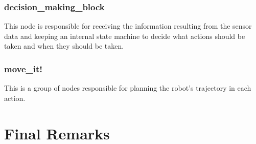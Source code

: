 \subsubsection{decision\_making\_block}

This node is responsible for receiving the information resulting from the sensor data and keeping an internal state machine to decide what actions should be taken and when they should be taken.

\subsubsection{move\_it!}

This is a group of nodes responsible for planning the robot's trajectory in each action.
\fi

\section{Final Remarks}
